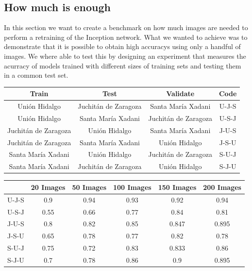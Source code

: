 \subsection{How much is enough}

In this section we want to create a benchmark on how much images are needed to perform a retraining of the Inception network. What we wanted to achieve was to demonstrate that it is possible to obtain high accuracys using only a handful of images. We where able to test this by designing an experiment that measures the acurracy of models trained with different sizes of training sets and testing them in a common test set. 


\begin{center}
  \begin{tabular}{|c|c|c|c|}
    \hline
    Train                  &Test                   &Validate               & Code \\ \hline
    Uni\'on Hidalgo        &Juchit\'an de Zaragoza &Santa Mar\'ia Xadani   &U-J-S \\ \hline
    Uni\'on Hidalgo        &Santa Mar\'ia Xadani   &Juchit\'an de Zaragoza &U-S-J \\ \hline
    Juchit\'an de Zaragoza &Uni\'on Hidalgo        &Santa Mar\'ia Xadani   &J-U-S \\ \hline
    Juchit\'an de Zaragoza &Santa Mar\'ia Xadani   &Uni\'on Hidalgo        &J-S-U \\ \hline
    Santa Mar\'ia Xadani   &Uni\'on Hidalgo        &Juchit\'an de Zaragoza &S-U-J \\ \hline
    Santa Mar\'ia Xadani   &Juchit\'an de Zaragoza &Uni\'on Hidalgo        &S-J-U \\ 
    \hline
  \end{tabular}
\end{center}


\begin{center}
  \begin{tabular}{|c|c|c|c|c|c|}
    \hline
         &20 Images &50 Images &100 Images&150 Images&200 Images\\ \hline
    U-J-S&0.9 &0.94&0.93&0.92 &0.94  \\ \hline
    U-S-J&0.55&0.66&0.77&0.84 &0.81  \\ \hline
    J-U-S&0.8 &0.82&0.85&0.847&0.895 \\ \hline
    J-S-U&0.65&0.78&0.77&0.82 &0.78  \\ \hline
    S-U-J&0.75&0.72&0.83&0.833&0.86  \\ \hline
    S-J-U&0.7 &0.78&0.86&0.9  &0.895 \\ 
    \hline
  \end{tabular}
\end{center}

